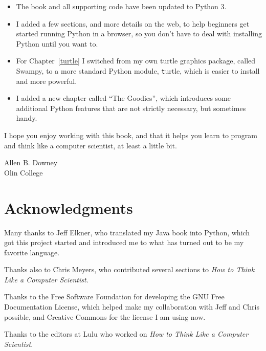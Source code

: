 \documentclass[
DIV=11,
fontsize=13,
twoside,
headinclude=false,
titlepage=firstiscover,
abstract=true,
headsepline=true,
footsepline=true,
chapterprefix=true, %
headings=big,
bibliography=totoc,%
captions=tableheading
]{scrbook}
\theoremstyle{definition}
\begin{document}
\begin{itemize}

\item The book and all supporting code have been updated to Python 3.

\item I added a few sections, and more details on the web, to help
beginners get started running Python in a browser, so you don't have
to deal with installing Python until you want to.

\item For Chapter~\ref{turtle} I switched from my own turtle graphics
  package, called Swampy, to a more standard Python module, {\texttt
    turtle}, which is easier to install and more powerful.

\item I added a new chapter called ``The Goodies'', which introduces
some additional Python features that are not strictly necessary, but
sometimes handy.

\end{itemize}

I hope you enjoy working with this book, and that it helps
you learn to program and think like
a computer scientist, at least a little bit.


Allen B. Downey \\

Olin College \\


\section*{Acknowledgments}

Many thanks to Jeff Elkner, who
translated my Java book into Python, which got this project
started and introduced me to what has turned out to be my
favorite language.

Thanks also to Chris Meyers, who contributed several sections
to {\em How to Think Like a Computer Scientist}.

Thanks to the Free Software Foundation for developing
the GNU Free Documentation License, which helped make
my collaboration with Jeff and Chris possible, and Creative
Commons for the license I am using now.

Thanks to the editors at Lulu who worked on
{\em How to Think Like a Computer Scientist}.
\end{document}
